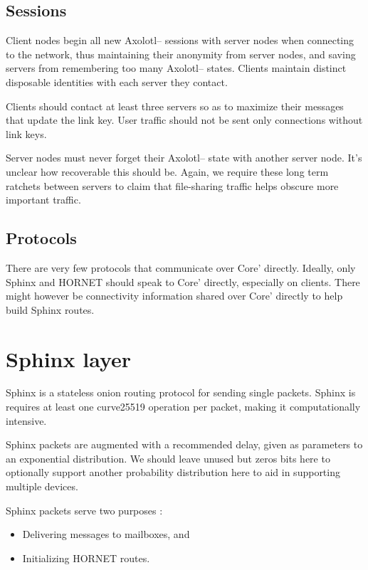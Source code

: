 \subsection{Sessions}

Client nodes begin all new Axolotl-- sessions with server nodes when
connecting to the network, thus maintaining their anonymity from server
nodes, and saving servers from remembering too many Axolotl-- states.
Clients maintain distinct disposable identities with each server they
contact.  

Clients should contact at least three servers so as to maximize their
messages that update the link key.  User traffic should not be sent only
connections without link keys.

Server nodes must never forget their Axolotl-- state with another server
node.  It's unclear how recoverable this should be.  Again, we require
these long term ratchets between servers to claim that file-sharing
traffic helps obscure more important traffic.

\subsection{Protocols}

There are very few protocols that communicate over Core' directly.
Ideally, only Sphinx and HORNET should speak to Core' directly,
especially on clients.  There might however be connectivity information
shared over Core' directly to help build Sphinx routes.


\section{Sphinx layer}

Sphinx is a stateless onion routing protocol for sending single packets.
Sphinx is requires at least one curve25519 operation per packet, making
it computationally intensive.  

Sphinx packets are augmented with a recommended delay, given as
parameters to an exponential distribution.  We should leave unused but
zeros bits here to optionally support another probability distribution
here to aid in supporting multiple devices.  

Sphinx packets serve two purposes : 
\begin{itemize}
\item Delivering messages to mailboxes, and
\item Initializing HORNET routes.
\end{itemize}

